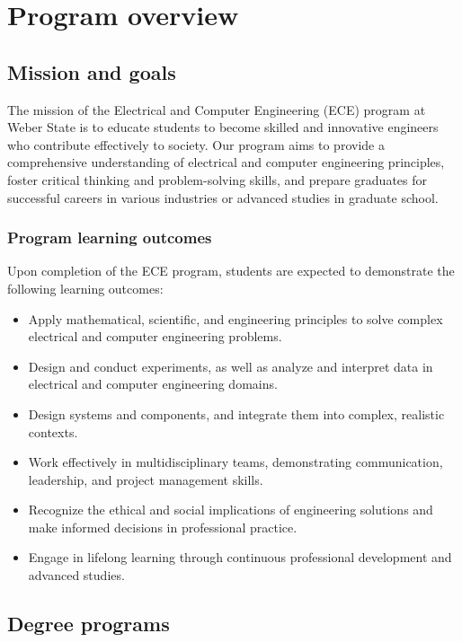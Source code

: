 
\chapter{Program overview}
\label{cha:program-overview}

\section{Mission and goals}
\label{sec:mission-goals}

The mission of the Electrical and Computer Engineering (ECE) program at Weber State is to educate students to become skilled and innovative engineers who contribute effectively to society. Our program aims to provide a comprehensive understanding of electrical and computer engineering principles, foster critical thinking and problem-solving skills, and prepare graduates for successful careers in various industries or advanced studies in graduate school.

\subsection{Program learning outcomes}
\label{sec:progr-learn-outc}


Upon completion of the ECE program, students are expected to demonstrate the following learning outcomes:

\begin{itemize}
\item Apply mathematical, scientific, and engineering principles to solve complex electrical and computer engineering problems.
\item Design and conduct experiments, as well as analyze and interpret data in electrical and computer engineering domains.
\item Design systems and components, and integrate them into complex, realistic contexts.
\item Work effectively in multidisciplinary teams, demonstrating communication, leadership, and project management skills.
\item Recognize the ethical and social implications of engineering solutions and make informed decisions in professional practice.
\item Engage in lifelong learning through continuous professional development and advanced studies.
\end{itemize}

\section{Degree programs}
\label{sec:degree-programs}

